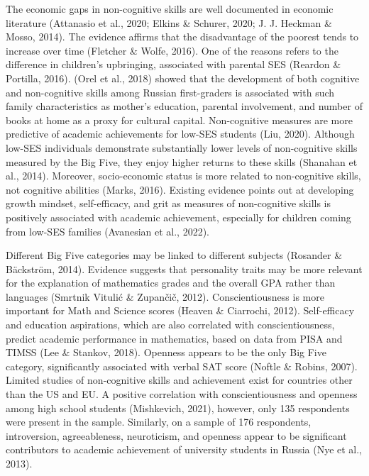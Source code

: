 \documentclass[
  12pt,
  a4paper,
]{article}
\begin{document}
The economic gaps in non-cognitive skills are well documented in
economic literature (Attanasio et al., 2020; Elkins \& Schurer, 2020; J.
J. Heckman \& Mosso, 2014). The evidence affirms that the disadvantage
of the poorest tends to increase over time (Fletcher \& Wolfe, 2016).
One of the reasons refers to the difference in children's upbringing,
associated with parental SES (Reardon \& Portilla, 2016). (Orel et al.,
2018) showed that the development of both cognitive and non-cognitive
skills among Russian first-graders is associated with such family
characteristics as mother's education, parental involvement, and number
of books at home as a proxy for cultural capital. Non-cognitive measures
are more predictive of academic achievements for low-SES students (Liu,
2020). Although low-SES individuals demonstrate substantially lower
levels of non-cognitive skills measured by the Big Five, they enjoy
higher returns to these skills (Shanahan et al., 2014). Moreover,
socio-economic status is more related to non-cognitive skills, not
cognitive abilities (Marks, 2016). Existing evidence points out at
developing growth mindset, self-efficacy, and grit as measures of
non-cognitive skills is positively associated with academic achievement,
especially for children coming from low-SES families (Avanesian et al.,
2022).

Different Big Five categories may be linked to different subjects
(Rosander \& Bäckström, 2014). Evidence suggests that personality traits
may be more relevant for the explanation of mathematics grades and the
overall GPA rather than languages (Smrtnik Vitulić \& Zupančič, 2012).
Conscientiousness is more important for Math and Science scores (Heaven
\& Ciarrochi, 2012). Self-efficacy and education aspirations, which are
also correlated with conscientiousness, predict academic performance in
mathematics, based on data from PISA and TIMSS (Lee \& Stankov, 2018).
Openness appears to be the only Big Five category, significantly
associated with verbal SAT score (Noftle \& Robins, 2007). Limited
studies of non-cognitive skills and achievement exist for countries
other than the US and EU. A positive correlation with conscientiousness
and openness among high school students (Mishkevich, 2021), however,
only 135 respondents were present in the sample. Similarly, on a sample
of 176 respondents, introversion, agreeableness, neuroticism, and
openness appear to be significant contributors to academic achievement
of university students in Russia (Nye et al., 2013).
\end{document}
